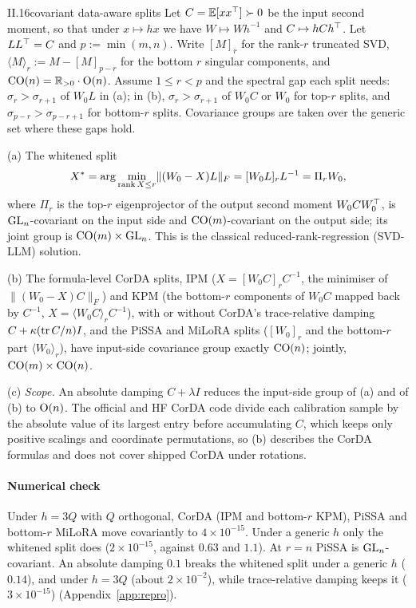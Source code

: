 \begin{proposition}{II.16}{covariant data-aware splits}
Let $C=\mathbb E[xx^{\top}]\succ0$ be the input second moment, so that under $x\mapsto hx$ we have $W\mapsto Wh^{-1}$ and
$C\mapsto hCh^{\top}$. Let $LL^{\top}=C$ and $p:=\min(m,n)$. Write $[M]_r$ for the rank-$r$ truncated SVD,
$\langle M\rangle_r:=M-[M]_{p-r}$ for the bottom $r$ singular components, and $\mathrm{CO}(n)=\mathbb{R}_{>0}\cdot\mathrm{O}(n)$. Assume
$1\le r<p$ and the spectral gap each split needs: $\sigma_r>\sigma_{r+1}$ of $W_0L$ in (a); in (b),
$\sigma_r>\sigma_{r+1}$ of $W_0C$ or $W_0$ for top-$r$ splits, and $\sigma_{p-r}>\sigma_{p-r+1}$ for bottom-$r$ splits.
Covariance groups are taken over the generic set where these gaps hold.

(a) The whitened split
\begin{equation*}
  X^*=\arg\min_{\operatorname{rank} X\le r}\lVert(W_0-X)L\rVert_F=[W_0L]_rL^{-1}=\Pi_rW_0,
\end{equation*}
where $\Pi_r$ is the top-$r$ eigenprojector of the output second moment $W_0CW_0^{\top}$, is $\mathrm{GL}_n$-covariant on the input
side and $\mathrm{CO}(m)$-covariant on the output side; its joint group is $\mathrm{CO}(m)\times\mathrm{GL}_n$. This is the classical
reduced-rank-regression (SVD-LLM) solution.

(b) The formula-level CorDA splits, IPM ($X=[W_0C]_rC^{-1}$, the minimiser of $\lVert(W_0-X)C\rVert_F$) and KPM (the
bottom-$r$ components of $W_0C$ mapped back by $C^{-1}$, $X=\langle W_0C\rangle_rC^{-1}$), with or without CorDA's
trace-relative damping $C+\kappa(\operatorname{tr} C/n)I$, and the PiSSA and MiLoRA splits ($[W_0]_r$ and the bottom-$r$ part
$\langle W_0\rangle_r$), have input-side covariance group exactly $\mathrm{CO}(n)$; jointly, $\mathrm{CO}(m)\times\mathrm{CO}(n)$.

(c) \emph{Scope.} An absolute damping $C+\lambda I$ reduces the input-side group of (a) and of (b) to $\mathrm{O}(n)$. The
official and HF CorDA code divide each calibration sample by the absolute value of its largest entry before
accumulating $C$, which keeps only positive scalings and coordinate permutations, so (b) describes the CorDA formulas and
does not cover shipped CorDA under rotations.
\end{proposition}

\paragraph{Numerical check}
Under $h=3Q$ with $Q$ orthogonal, CorDA (IPM and bottom-$r$ KPM), PiSSA and bottom-$r$ MiLoRA move covariantly to
$4\times10^{-15}$. Under a generic $h$ only the whitened split does ($2\times10^{-15}$, against $0.63$ and $1.1$). At
$r=n$ PiSSA is $\mathrm{GL}_n$-covariant. An absolute damping $0.1$ breaks the whitened split under a generic $h$ ($0.14$), and
under $h=3Q$ (about $2\times10^{-2}$), while trace-relative damping keeps it ($3\times10^{-15}$)
(Appendix~\ref{app:repro}).

